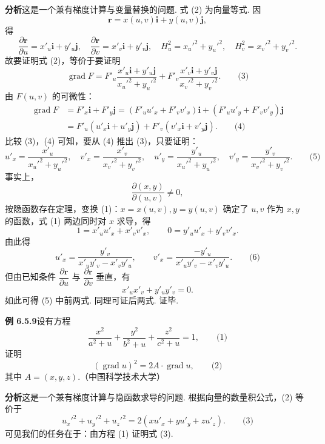 \documentclass[UTF8,12pt,a4paper,fontset=fandol]{ctexart}
\begin{document}
\noindent\textbf{分析}\quad 这是一个兼有梯度计算与变量替换的问题. 式 (2) 为向量等式. 因
\[
  \mathbf r=x(u,v)\mathbf i+y(u,v)\mathbf j,
\]
得
\[
  \frac{\partial\mathbf r}{\partial u}=x'_u\mathbf i+y'_u\mathbf j,\quad
  \frac{\partial\mathbf r}{\partial v}=x'_v\mathbf i+y'_v\mathbf j,\quad
  H_u^2=x_u'^2+y_u'^2,\quad H_v^2=x_v'^2+y_v'^2.
\]
故要证明式 (2)，等价于要证明
\[
  \operatorname{grad}F
  =
  F'_u\frac{x'_u\mathbf i+y'_u\mathbf j}{x_u'^2+y_u'^2}
  +
  F'_v\frac{x'_v\mathbf i+y'_v\mathbf j}{x_v'^2+y_v'^2}. \qquad\text{(3)}
\]
由 $F(u,v)$ 的可微性：
\[
\begin{aligned}
  \operatorname{grad}F
  &=F'_x\mathbf i+F'_y\mathbf j
  =(F'_u u'_x+F'_v v'_x)\mathbf i+(F'_u u'_y+F'_v v'_y)\mathbf j\\
  &=F'_u(u'_x\mathbf i+u'_y\mathbf j)+F'_v(v'_x\mathbf i+v'_y\mathbf j). \qquad\text{(4)}
\end{aligned}
\]
比较 (3)，(4) 可知，要从 (4) 推出 (3)，只要证明：
\[
  u'_x=\frac{x'_u}{x_u'^2+y_u'^2},\quad
  v'_x=\frac{x'_v}{x_v'^2+y_v'^2},\quad
  u'_y=\frac{y'_u}{x_u'^2+y_u'^2},\quad
  v'_y=\frac{y'_v}{x_v'^2+y_v'^2}. \qquad\text{(5)}
\]
事实上，
\[
  \frac{\partial(x,y)}{\partial(u,v)}\ne0,
\]
按隐函数存在定理，变换 (1)：$x=x(u,v),y=y(u,v)$ 确定了 $u,v$ 作为 $x,y$ 的函数，式 (1) 两边同时对 $x$ 求导，得
\[
  1=x'_u u'_x+x'_v v'_x,\qquad
  0=y'_u u'_x+y'_v v'_x.
\]
由此得
\[
  u'_x=\frac{y'_v}{x'_uy'_v-x'_vy'_u},\qquad
  v'_x=\frac{-y'_u}{x'_uy'_v-x'_vy'_u}. \qquad\text{(6)}
\]
但由已知条件 $\dfrac{\partial\mathbf r}{\partial u}$ 与
$\dfrac{\partial\mathbf r}{\partial v}$ 垂直，有
\[
  x'_ux'_v+y'_uy'_v=0.
\]
如此可得 (5) 中前两式. 同理可证后两式. 证毕.

\noindent\textbf{例 6.5.9}\quad 设有方程
\[
  \frac{x^2}{a^2+u}+\frac{y^2}{b^2+u}+\frac{z^2}{c^2+u}=1, \qquad\text{(1)}
\]
证明
\[
  (\operatorname{grad}u)^2=2A\cdot\operatorname{grad}u, \qquad\text{(2)}
\]
其中 $A=(x,y,z)$.（中国科学技术大学）

\noindent\textbf{分析}\quad 这是一个兼有梯度计算与隐函数求导的问题. 根据向量的数量积公式，(2) 等价于
\[
  u_x'^2+u_y'^2+u_z'^2=2(xu'_x+yu'_y+zu'_z). \qquad\text{(3)}
\]
可见我们的任务在于：由方程 (1) 证明式 (3).
\end{document}
